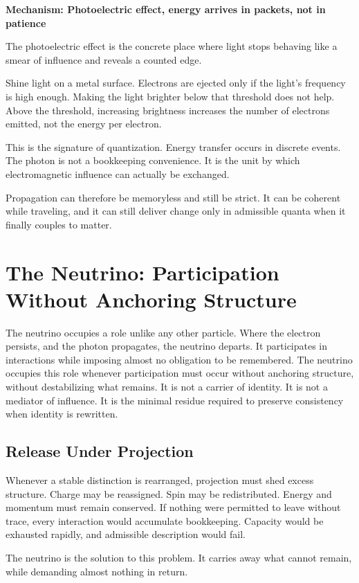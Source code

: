 \documentclass[11pt,twoside,openright]{book}
\newenvironment{mechanismbox}[1]
  {\begin{framed}\noindent\textbf{Mechanism: #1}\par\medskip}
  {\end{framed}}
\begin{document}
\begin{mechanismbox}{Photoelectric effect, energy arrives in packets, not in patience}
The photoelectric effect is the concrete place where light stops behaving like a smear of influence and reveals a counted edge.

Shine light on a metal surface. Electrons are ejected only if the light's frequency is high enough. Making the light brighter below that threshold does not help. Above the threshold, increasing brightness increases the number of electrons emitted, not the energy per electron.

This is the signature of quantization. Energy transfer occurs in discrete events. The photon is not a bookkeeping convenience. It is the unit by which electromagnetic influence can actually be exchanged.

Propagation can therefore be memoryless and still be strict.
It can be coherent while traveling,
and it can still deliver change only in admissible quanta when it finally couples to matter.
\end{mechanismbox}
\chapter{The Neutrino: Participation Without Anchoring Structure}

The neutrino occupies a role unlike any other particle. Where the electron persists, and the photon propagates, the neutrino departs. It participates in interactions while imposing almost no obligation to be remembered. The neutrino occupies this role whenever participation must occur without anchoring structure, without destabilizing what remains. It is not a carrier of identity. It is not a mediator of influence. It is the minimal residue required to preserve consistency when identity is rewritten.

\section*{Release Under Projection}

Whenever a stable distinction is rearranged, projection must shed excess structure. Charge may be reassigned. Spin may be redistributed. Energy and momentum must remain conserved. If nothing were permitted to leave without trace, every interaction would accumulate bookkeeping. Capacity would be exhausted rapidly, and admissible description would fail.

The neutrino is the solution to this problem. It carries away what cannot remain, while demanding almost nothing in return.
\end{document}
